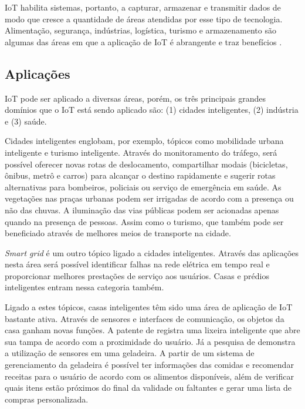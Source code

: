 IoT habilita sistemas, portanto, a capturar, armazenar e transmitir dados de modo que
cresce a quantidade de áreas atendidas por esse tipo de tecnologia.
Alimentação, segurança, indústrias, logística, turismo e armazenamento são
algumas das áreas em que a aplicação de IoT é abrangente e traz benefícios
\cite{xu2014ubiquitous}.

\subsection{Aplicações} \label{subsec:iot-aplicacoes}

IoT pode ser aplicado a diversas áreas, porém, os três principais grandes 
domínios que o IoT está sendo aplicado são: (1) cidades inteligentes, 
(2) indústria e (3) saúde.

Cidades inteligentes englobam, por exemplo, tópicos como mobilidade urbana
inteligente e turismo inteligente. Através do monitoramento do tráfego, será
possível oferecer novas rotas de deslocamento, compartilhar modais (bicicletas,
ônibus, metrô e carros) para alcançar o destino rapidamente e sugerir rotas
alternativas para bombeiros, policiais ou serviço de emergência em saúde. As
vegetações nas praças urbanas podem ser irrigadas de acordo com a presença ou
não das chuvas. A iluminação das vias públicas podem ser acionadas apenas
quando na presença de pessoas. Assim como o turismo, que também pode ser
beneficiado através de melhores meios de transporte na cidade. 

\textit{Smart grid} é um outro tópico ligado a cidades inteligentes. Através
das aplicações nesta área será possível identificar falhas na rede elétrica em 
tempo real e proporcionar melhores prestações de serviço aos usuários. Casas
e prédios inteligentes entram nessa categoria também.

Ligado a estes tópicos, casas inteligentes têm sido uma área de aplicação de
IoT bastante ativa. Através de sensores e interfaces de comunicação, os objetos
da casa ganham novas funções. A patente de  registra
uma lixeira inteligente que abre sua tampa de acordo com a proximidade do
usuário. Já a pesquisa de  demonstra a utilização de
sensores em uma geladeira. A partir de um sistema de gerenciamento da geladeira
é possível ter informações das comidas e recomendar receitas para o usuário de
acordo com os alimentos disponíveis, além de verificar quais itens estão
próximos do final da validade ou faltantes e gerar uma lista de compras
personalizada.

